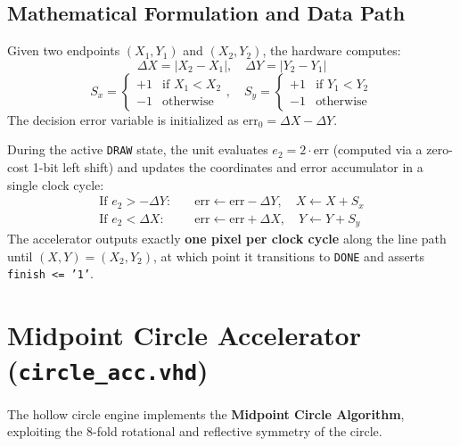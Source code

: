 \subsection{Mathematical Formulation and Data Path}
Given two endpoints $(X_1, Y_1)$ and $(X_2, Y_2)$, the hardware computes:
\begin{equation}
\Delta X = |X_2 - X_1|, \quad \Delta Y = |Y_2 - Y_1|
\end{equation}
\begin{equation}
S_x = \begin{cases} +1 & \text{if } X_1 < X_2 \\ -1 & \text{otherwise} \end{cases}, \quad S_y = \begin{cases} +1 & \text{if } Y_1 < Y_2 \\ -1 & \text{otherwise} \end{cases}
\end{equation}
The decision error variable is initialized as $\text{err}_0 = \Delta X - \Delta Y$.

During the active \texttt{DRAW} state, the unit evaluates $e_2 = 2 \cdot \text{err}$ (computed via a zero-cost 1-bit left shift) and updates the coordinates and error accumulator in a single clock cycle:
\begin{align}
\text{If } e_2 > -\Delta Y: & \quad \text{err} \gets \text{err} - \Delta Y, \quad X \gets X + S_x \\
\text{If } e_2 < \Delta X: & \quad \text{err} \gets \text{err} + \Delta X, \quad Y \gets Y + S_y
\end{align}
The accelerator outputs exactly \textbf{one pixel per clock cycle} along the line path until $(X, Y) = (X_2, Y_2)$, at which point it transitions to \texttt{DONE} and asserts \texttt{finish <= '1'}.

\section{Midpoint Circle Accelerator (\texttt{circle\_acc.vhd})}
The hollow circle engine implements the \textbf{Midpoint Circle Algorithm}, exploiting the 8-fold rotational and reflective symmetry of the circle.

